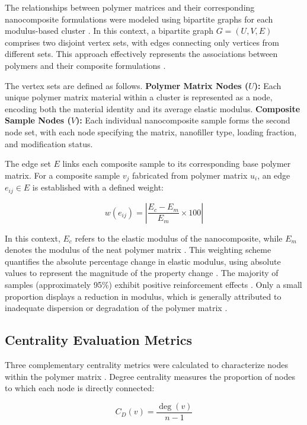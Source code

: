\documentclass[conference]{IEEEtran}
\begin{document}
The relationships between polymer matrices and their corresponding nanocomposite formulations were modeled using bipartite graphs for each modulus-based cluster \cite{10, 11, 22}. In this context, a bipartite graph $G = (U, V, E)$ comprises two disjoint vertex sets, with edges connecting only vertices from different sets. This approach effectively represents the associations between polymers and their composite formulations \cite{8, 14}.

The vertex sets are defined as follows. \textbf{Polymer Matrix Nodes ($U$):} Each unique polymer matrix material within a cluster is represented as a node, encoding both the material identity and its average elastic modulus. \textbf{Composite Sample Nodes ($V$):} Each individual nanocomposite sample forms the second node set, with each node specifying the matrix, nanofiller type, loading fraction, and modification status.

The edge set $E$ links each composite sample to its corresponding base polymer matrix. For a composite sample $v_j$ fabricated from polymer matrix $u_i$, an edge $e_{ij} \in E$ is established with a defined weight:

\begin{equation}
w(e_{ij}) = \left| \frac{E_c - E_m}{E_m} \times 100 \right|
\end{equation}

In this context, $E_c$ refers to the elastic modulus of the nanocomposite, while $E_m$ denotes the modulus of the neat polymer matrix \cite{10, 11, 24}. This weighting scheme quantifies the absolute percentage change in elastic modulus, using absolute values to represent the magnitude of the property change \cite{14, 22}. The majority of samples (approximately 95\%) exhibit positive reinforcement effects \cite{112, 127}. Only a small proportion displays a reduction in modulus, which is generally attributed to inadequate dispersion or degradation of the polymer matrix \cite{25, 92, 140}.

\subsection{Centrality Evaluation Metrics}

Three complementary centrality metrics were calculated to characterize nodes within the polymer matrix \cite{8, 11}. Degree centrality measures the proportion of nodes to which each node is directly connected:

\begin{equation}
C_D(v) = \frac{\deg(v)}{n-1}
\end{equation}
\end{document}
